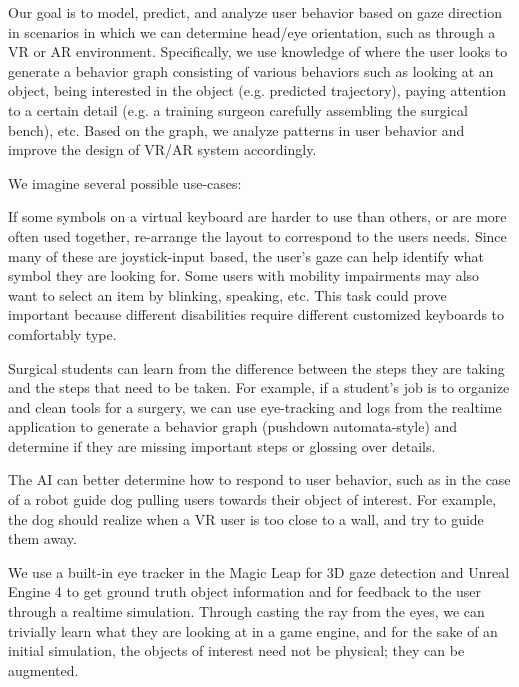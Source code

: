 \vspace{-2em}
Our goal is to model, predict, and analyze user behavior based on gaze direction in scenarios in which we can determine head/eye orientation, such as through a VR or AR environment. Specifically, we use knowledge of where the user looks to generate a behavior graph consisting of various behaviors such as looking at an object, being interested in the object (e.g. predicted trajectory), paying attention to a certain detail (e.g. a training surgeon carefully assembling the surgical bench), etc. Based on the graph, we analyze patterns in user behavior and improve the design of VR/AR system accordingly.

We imagine several possible use-cases: \vspace{-1em}
\begin{description}[noitemsep]
    \item[Adaptive Impaired-user Keyboards] If some symbols on a virtual keyboard are harder to use than others, or are more often used together, re-arrange the layout to correspond to the users needs. Since many of these are joystick-input based, the user's gaze can help identify what symbol they are looking for. Some users with mobility impairments may also want to select an item by blinking, speaking, etc. This task could prove important because different disabilities require different customized keyboards to comfortably type.
    \item[Surgical Training] Surgical students can learn from the difference between the steps they are taking and the steps that need to be taken. For example, if a student's job is to organize and clean tools for a surgery, we can use eye-tracking and logs from the realtime application to generate a behavior graph (pushdown automata-style) and determine if they are missing important steps or glossing over details.
    \item[Dynamic Robot AI] The AI can better determine how to respond to user behavior, such as in the case of a robot guide dog pulling users towards their object of interest. For example, the dog should realize when a VR user is too close to a wall, and try to guide them away.
\end{description}



\vspace{-1em}
We use a built-in eye tracker in the Magic Leap for 3D gaze detection and Unreal Engine 4 to get ground truth object information and for feedback to the user through a realtime simulation. Through casting the ray from the eyes, we can trivially learn what they are looking at in a game engine, and for the sake of an initial simulation, the objects of interest need not be physical; they can be augmented.




